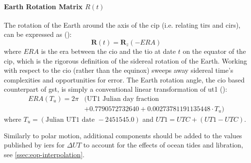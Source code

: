 \paragraph{Earth Rotation Matrix $R(t)$}\label{par:earth-rotation-matrix}
The rotation of the Earth around the axis of the \gls{cip} (i.e. relating 
\gls{tirs} and \gls{cirs}), can be expressed as (\cite{iers2010}):
\begin{equation}
  \bm{R}(t) = \bm{R}_z (-ERA)
  \label{eq:iers1055}
\end{equation}
where $ERA$ is the \gls{era} between the \gls{cio} and the \gls{tio} 
at date $t$ on the equator of the \gls{cip}, which is the rigorous definition 
of the sidereal rotation of the Earth. Working with respect to the \gls{cio} 
(rather than the equinox) sweeps away sidereal time's complexities and opportunities 
for error. The Earth rotation angle, the \gls{cio} based counterpart of \gls{gst},
is simply a conventional linear transformation of \gls{ut1} (\cite{sofa_18141_eacb}):
\begin{equation}
  \label{eq:iers10515}
  \begin{split}
    ERA(T_u) = 2 \pi & ( \text{UT1 Julian day fraction } \\
                     & + 0.7790572732640 + 0.00273781191135448 \cdot T_u )
    \end{split}
\end{equation}
where $T_u = \left( \text{Julian UT1 date } - 2451545.0 \right)$ and 
$UT1=UTC+(UT1-UTC)$. 

Similarly to polar motion, additional components should 
be added to the values published by \gls{iers} for $\Delta UT$ to account for 
the effects of ocean tides and libration, see \ref{ssec:eop-interpolation}. 


